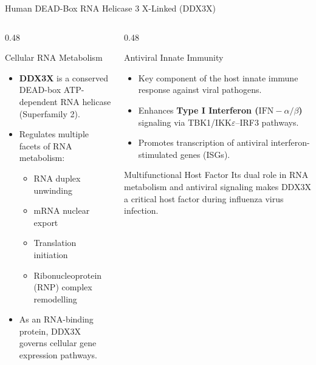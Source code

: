 \documentclass[aspectratio=169, 10pt]{beamer}
\begin{document}
\begin{frame}{Human DEAD-Box RNA Helicase 3 X-Linked (DDX3X)}
  \begin{columns}[T]
    \begin{column}{0.48\textwidth}
      \begin{block}{Cellular RNA Metabolism}
        \begin{itemize}
          \item \textbf{DDX3X} is a conserved DEAD-box ATP-dependent RNA helicase (Superfamily 2).
          \item Regulates multiple facets of RNA metabolism:
            \begin{itemize}
              \item RNA duplex unwinding
              \item mRNA nuclear export
              \item Translation initiation
              \item Ribonucleoprotein (RNP) complex remodelling
            \end{itemize}
          \item As an RNA-binding protein, DDX3X governs cellular gene expression pathways.
        \end{itemize}
      \end{block}
    \end{column}

    \begin{column}{0.48\textwidth}
      \begin{exampleblock}{Antiviral Innate Immunity}
        \begin{itemize}
          \item Key component of the host innate immune response against viral pathogens.
          \item Enhances \textbf{Type I Interferon ($\text{IFN}-\alpha/\beta$)} signaling via TBK1/IKK$\varepsilon$--IRF3 pathways.
          \item Promotes transcription of antiviral interferon-stimulated genes (ISGs).
        \end{itemize}
      \end{exampleblock}
      \vspace{0.25cm}
      \begin{alertblock}{Multifunctional Host Factor}
        \small Its dual role in RNA metabolism and antiviral signaling makes DDX3X a critical host factor during influenza virus infection.
      \end{alertblock}
    \end{column}
  \end{columns}
\end{frame}
\end{document}
